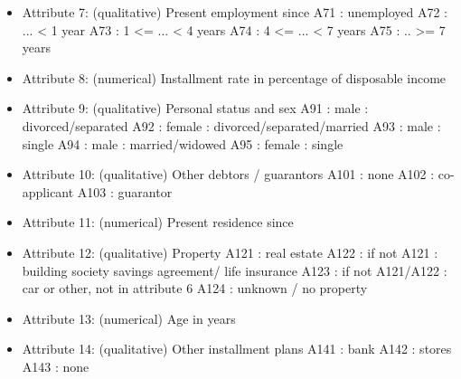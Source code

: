 \documentclass[10pt]{article}\usepackage[]{graphicx}\usepackage[]{color}
\begin{document}
\begin{itemize}
\item Attribute 7: (qualitative) Present employment since 
\newline A71 : unemployed 
\newline A72 : ... < 1 year 
\newline A73 : 1 <= ... < 4 years 
\newline A74 : 4 <= ... < 7 years 
\newline A75 : .. >= 7 years 

\item Attribute 8: (numerical) Installment rate in percentage of disposable income 

\item Attribute 9: (qualitative) Personal status and sex 
\newline A91 : male : divorced/separated 
\newline A92 : female : divorced/separated/married 
\newline A93 : male : single 
\newline A94 : male : married/widowed 
\newline A95 : female : single 

\item Attribute 10: (qualitative) Other debtors / guarantors 
\newline A101 : none 
\newline A102 : co-applicant 
\newline A103 : guarantor 

\item Attribute 11: (numerical) Present residence since 

\item Attribute 12: (qualitative) Property 
\newline A121 : real estate 
\newline A122 : if not A121 : building society savings agreement/ life insurance 
\newline A123 : if not A121/A122 : car or other, not in attribute 6 
\newline A124 : unknown / no property 

\item Attribute 13: (numerical) Age in years 

\item Attribute 14: (qualitative) Other installment plans 
\newline A141 : bank 
\newline A142 : stores 
\newline A143 : none 


\end{itemize}
\end{document}
